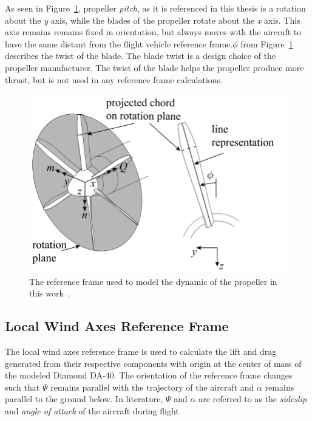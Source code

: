 As seen in Figure~\ref{fig:propframe}, propeller \textit{pitch}, as it is referenced in this thesis is a rotation about the \textit{y} axis, while the blades of the propeller rotate about the \textit{x} axis. This axis remains remains fixed in orientation, but always moves with the aircraft to have the same distant from the flight vehicle reference frame.\( \phi{}\) from Figure~\ref{fig:propframe} describes the twist of the blade. The blade twist is a design choice of the propeller manufacturer. The twist of the blade helps the propeller produce more thrust, but is not used in any reference frame calculations.

\begin{figure}[!ht]\label{fig:propframe}
    \centering
    \includegraphics[width=0.75\linewidth]{Figures/propframe.png}
    \caption{The reference frame used to model the dynamic of the propeller in this work~\cite{vanarnhemEngineeringMethodEstimate2020}.}
\end{figure}

\subsection{Local Wind Axes Reference Frame}
The local wind axes reference frame is used to calculate the lift and drag generated from their respective components with origin at the center of mass of the modeled Diamond DA-40. The orientation of the reference frame changes such that \(\Psi \) remains parallel with the trajectory of the aircraft and \(\alpha \) remains parallel to the ground below. In literature, \( \Psi \) and \(\alpha \) are referred to as the \textit{sideslip} and \textit{angle of attack} of the aircraft during flight.

